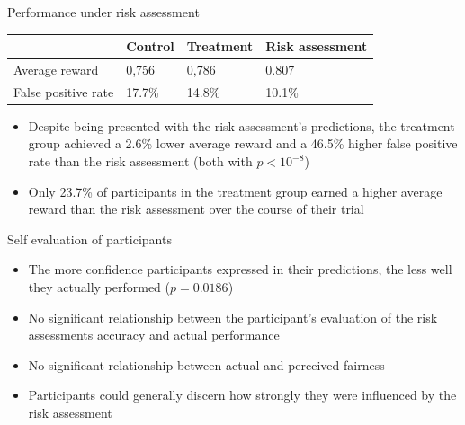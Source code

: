 \documentclass[11pt]{beamer}
\begin{document}
\begin{frame}{Performance under risk assessment}
\begin{table}[]
	\begin{tabular}{@{}llll}
		\toprule
		& \textbf{Control} & \textbf{Treatment} &\textbf{Risk assessment} \\ \midrule
		Average reward      & 0,756            & 0,786 & 0.807               \\ \midrule
		False positive rate & 17.7\%           & 14.8\% & 10.1\%             \\ \bottomrule
	\end{tabular}
\end{table}
\begin{itemize}
	\item  Despite being presented with the risk assessment’s predictions, the treatment group achieved
	a 2.6\% lower average reward and a 46.5\% higher false positive rate
	than the risk assessment (both with $p < 10^{-8}$)
	\item  Only 23.7\% of participants in the treatment group earned a higher average reward than
	the risk assessment over the course of their trial
\end{itemize}
\end{frame}

\begin{frame}{Self evaluation of participants}
\begin{itemize}
	\item The more confidence participants expressed in their predictions, the less well they actually performed ($p=0.0186$)
	\item No significant relationship between the participant's evaluation of the risk assessments accuracy and actual performance
	\item No significant relationship between actual and perceived fairness
	\item Participants could generally discern how strongly they were influenced by the risk assessment
\end{itemize}
\end{frame}
\end{document}
